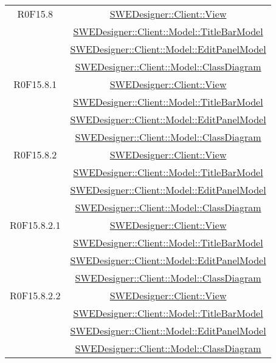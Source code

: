 \documentclass[../SpecificaTecnica.tex]{subfiles}
\begin{document}
\begin{longtable}{|c|c|}
		R0F15.8 & \hyperlink{SWEDesigner::Client::View}{SWEDesigner::Client::View}\\& \hyperlink{SWEDesigner::Client::Model::TitleBarModel}{SWEDesigner::Client::Model::TitleBarModel}\\& \hyperlink{SWEDesigner::Client::Model::EditPanelModel}{SWEDesigner::Client::Model::EditPanelModel}\\& \hyperlink{SWEDesigner::Client::Model::ClassDiagram}{SWEDesigner::Client::Model::ClassDiagram}\\\hline
		R0F15.8.1 & \hyperlink{SWEDesigner::Client::View}{SWEDesigner::Client::View}\\& \hyperlink{SWEDesigner::Client::Model::TitleBarModel}{SWEDesigner::Client::Model::TitleBarModel}\\& \hyperlink{SWEDesigner::Client::Model::EditPanelModel}{SWEDesigner::Client::Model::EditPanelModel}\\& \hyperlink{SWEDesigner::Client::Model::ClassDiagram}{SWEDesigner::Client::Model::ClassDiagram}\\\hline
		R0F15.8.2 & \hyperlink{SWEDesigner::Client::View}{SWEDesigner::Client::View}\\& \hyperlink{SWEDesigner::Client::Model::TitleBarModel}{SWEDesigner::Client::Model::TitleBarModel}\\& \hyperlink{SWEDesigner::Client::Model::EditPanelModel}{SWEDesigner::Client::Model::EditPanelModel}\\& \hyperlink{SWEDesigner::Client::Model::ClassDiagram}{SWEDesigner::Client::Model::ClassDiagram}\\\hline
		R0F15.8.2.1 & \hyperlink{SWEDesigner::Client::View}{SWEDesigner::Client::View}\\& \hyperlink{SWEDesigner::Client::Model::TitleBarModel}{SWEDesigner::Client::Model::TitleBarModel}\\& \hyperlink{SWEDesigner::Client::Model::EditPanelModel}{SWEDesigner::Client::Model::EditPanelModel}\\& \hyperlink{SWEDesigner::Client::Model::ClassDiagram}{SWEDesigner::Client::Model::ClassDiagram}\\\hline
		R0F15.8.2.2 & \hyperlink{SWEDesigner::Client::View}{SWEDesigner::Client::View}\\& \hyperlink{SWEDesigner::Client::Model::TitleBarModel}{SWEDesigner::Client::Model::TitleBarModel}\\& \hyperlink{SWEDesigner::Client::Model::EditPanelModel}{SWEDesigner::Client::Model::EditPanelModel}\\& \hyperlink{SWEDesigner::Client::Model::ClassDiagram}{SWEDesigner::Client::Model::ClassDiagram}\\\hline

\end{longtable}
\end{document}
